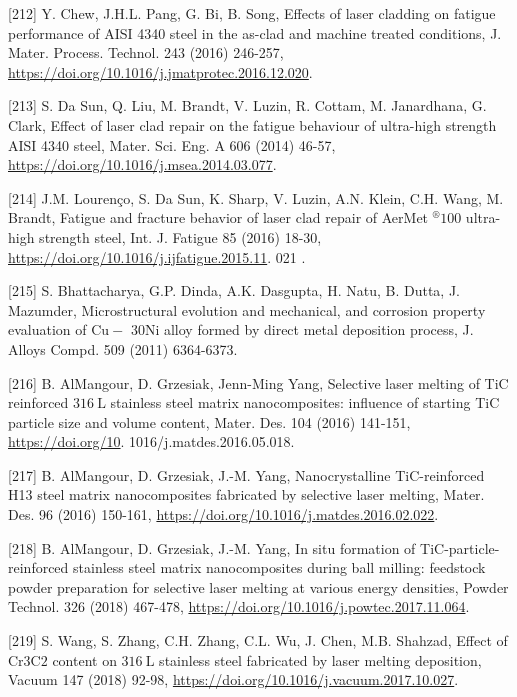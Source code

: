 \documentclass[10pt]{article}
\begin{document}
[212] Y. Chew, J.H.L. Pang, G. Bi, B. Song, Effects of laser cladding on fatigue performance of AISI 4340 steel in the as-clad and machine treated conditions, J. Mater. Process. Technol. 243 (2016) 246-257, \href{https://doi.org/10.1016/j.jmatprotec.2016.12.020}{https://doi.org/10.1016/j.jmatprotec.2016.12.020}.

[213] S. Da Sun, Q. Liu, M. Brandt, V. Luzin, R. Cottam, M. Janardhana, G. Clark, Effect of laser clad repair on the fatigue behaviour of ultra-high strength AISI 4340 steel, Mater. Sci. Eng. A 606 (2014) 46-57, \href{https://doi.org/10.1016/j.msea.2014.03.077}{https://doi.org/10.1016/j.msea.2014.03.077}.

[214] J.M. Lourenço, S. Da Sun, K. Sharp, V. Luzin, A.N. Klein, C.H. Wang, M. Brandt, Fatigue and fracture behavior of laser clad repair of AerMet ${ }^{\circledR} 100$ ultra-high strength steel, Int. J. Fatigue 85 (2016) 18-30, \href{https://doi.org/10.1016/j.ijfatigue.2015.11}{https://doi.org/10.1016/j.ijfatigue.2015.11}. 021 .

[215] S. Bhattacharya, G.P. Dinda, A.K. Dasgupta, H. Natu, B. Dutta, J. Mazumder, Microstructural evolution and mechanical, and corrosion property evaluation of $\mathrm{Cu}-$ 30Ni alloy formed by direct metal deposition process, J. Alloys Compd. 509 (2011) 6364-6373.

[216] B. AlMangour, D. Grzesiak, Jenn-Ming Yang, Selective laser melting of TiC reinforced $316 \mathrm{~L}$ stainless steel matrix nanocomposites: influence of starting TiC particle size and volume content, Mater. Des. 104 (2016) 141-151, \href{https://doi.org/10}{https://doi.org/10}. 1016/j.matdes.2016.05.018.

[217] B. AlMangour, D. Grzesiak, J.-M. Yang, Nanocrystalline TiC-reinforced H13 steel matrix nanocomposites fabricated by selective laser melting, Mater. Des. 96 (2016) 150-161, \href{https://doi.org/10.1016/j.matdes.2016.02.022}{https://doi.org/10.1016/j.matdes.2016.02.022}.

[218] B. AlMangour, D. Grzesiak, J.-M. Yang, In situ formation of TiC-particle-reinforced stainless steel matrix nanocomposites during ball milling: feedstock powder preparation for selective laser melting at various energy densities, Powder Technol. 326 (2018) 467-478, \href{https://doi.org/10.1016/j.powtec.2017.11.064}{https://doi.org/10.1016/j.powtec.2017.11.064}.

[219] S. Wang, S. Zhang, C.H. Zhang, C.L. Wu, J. Chen, M.B. Shahzad, Effect of $\mathrm{Cr} 3 \mathrm{C} 2$ content on $316 \mathrm{~L}$ stainless steel fabricated by laser melting deposition, Vacuum 147 (2018) 92-98, \href{https://doi.org/10.1016/j.vacuum.2017.10.027}{https://doi.org/10.1016/j.vacuum.2017.10.027}.
\end{document}

